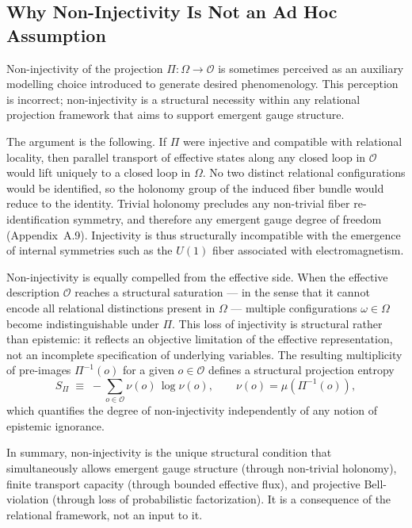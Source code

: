 \subsection{Why Non-Injectivity Is Not an Ad Hoc Assumption}
  \label{subsec:non-injectivity-not-ad-hoc}

  Non-injectivity of the projection $\Pi:\Omega\to\mathcal{O}$ is sometimes perceived as
  an auxiliary modelling choice introduced to generate desired phenomenology.
  This perception is incorrect; non-injectivity is a structural necessity within any
  relational projection framework that aims to support emergent gauge structure.

  The argument is the following.
  If $\Pi$ were injective and compatible with relational locality, then parallel
  transport of effective states along any closed loop in $\mathcal{O}$ would lift
  uniquely to a closed loop in $\Omega$.
  No two distinct relational configurations would be identified, so the holonomy group
  of the induced fiber bundle would reduce to the identity.
  Trivial holonomy precludes any non-trivial fiber re-identification symmetry, and
  therefore any emergent gauge degree of freedom (Appendix~A.9).
  Injectivity is thus structurally incompatible with the emergence of internal symmetries
  such as the $U(1)$ fiber associated with electromagnetism.

  Non-injectivity is equally compelled from the effective side.
  When the effective description $\mathcal{O}$ reaches a structural saturation --- in the
  sense that it cannot encode all relational distinctions present in $\Omega$ --- multiple
  configurations $\omega\in\Omega$ become indistinguishable under $\Pi$.
  This loss of injectivity is structural rather than epistemic: it reflects an objective
  limitation of the effective representation, not an incomplete specification of underlying
  variables.
  The resulting multiplicity of pre-images $\Pi^{-1}(o)$ for a given $o\in\mathcal{O}$
  defines a structural projection entropy
  \begin{equation}
    S_\Pi \;\equiv\; -\sum_{o\in\mathcal{O}} \nu(o)\,\log\nu(o),
    \qquad \nu(o) = \mu\!\left(\Pi^{-1}(o)\right),
  \end{equation}
  which quantifies the degree of non-injectivity independently of any notion of epistemic
  ignorance.

  In summary, non-injectivity is the unique structural condition that simultaneously
  allows emergent gauge structure (through non-trivial holonomy), finite transport
  capacity (through bounded effective flux), and projective Bell-violation (through
  loss of probabilistic factorization).
  It is a consequence of the relational framework, not an input to it.
